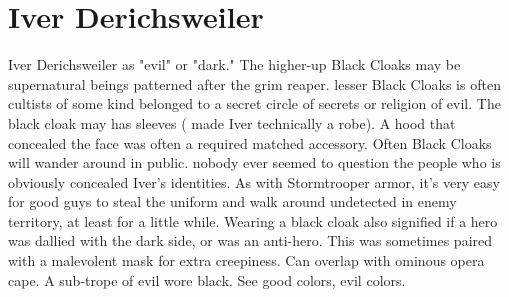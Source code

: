 \documentclass[12pt]{book}
\begin{document}
\chapter{Iver Derichsweiler}

Iver Derichsweiler as "evil" or "dark." The higher-up Black Cloaks may be supernatural beings patterned after the grim reaper. lesser Black Cloaks is often cultists of some kind belonged to a secret circle of secrets or religion of evil. The black cloak may has sleeves ( made Iver technically a robe). A hood that concealed the face was often a required matched accessory. Often Black Cloaks will wander around in public. nobody ever seemed to question the people who is obviously concealed Iver's identities. As with Stormtrooper armor, it's very easy for good guys to steal the uniform and walk around undetected in enemy territory, at least for a little while. Wearing a black cloak also signified if a hero was dallied with the dark side, or was an anti-hero. This was sometimes paired with a malevolent mask for extra creepiness. Can overlap with ominous opera cape. A sub-trope of evil wore black. See good colors, evil colors.
\end{document}

